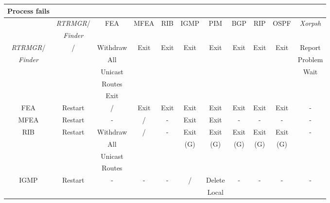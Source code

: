 \documentclass[11pt]{article}
\makeatletter
\newcommand{\finder} {{\em Finder}\@\xspace}
\newcommand{\xorpsh} {{\em Xorpsh}\@\xspace}
\newcommand{\rtrmgr} {{\em RTRMGR}\@\xspace}
\makeatother
\begin{document}
\begin{table}[ht]
\begin{center}
\begin{tabular}{|c|c|c|c|c|c|c|c|c|c|c|}
\hline
Process fails   &                 &          &      &      &      &         &      &      &      &         \\\hline
                & \rtrmgr/        & FEA      & MFEA & RIB  & IGMP & PIM     & BGP  & RIP  & OSPF & \xorpsh \\
                & \finder         &          &      &      &      &         &      &      &      &         \\\hline
\rtrmgr/        & /               & Withdraw & Exit & Exit & Exit & Exit    & Exit & Exit & Exit & Report  \\
\finder         &                 & All      &      &      &      &         &      &      &      & Problem \\
                &                 & Unicast  &      &      &      &         &      &      &      & Wait    \\
                &                 & Routes   &      &      &      &         &      &      &      &         \\
                &                 & Exit     &      &      &      &         &      &      &      &         \\\hline
FEA             &  Restart        & /        & Exit & Exit & Exit & Exit    & Exit & Exit & Exit & -       \\\hline
MFEA            &  Restart        & -        & /    & -    & Exit & Exit    & -    & -    & -    & -       \\\hline
RIB             &  Restart        & Withdraw & /    & -    & Exit & Exit    & Exit & Exit & Exit & -       \\
                &                 & All      &      &      & (G)  & (G)     & (G)  & (G)  & (G)  &         \\
                &                 & Unicast  &      &      &      &         &      &      &      &         \\
                &                 & Routes   &      &      &      &         &      &      &      &         \\\hline
IGMP            &  Restart        & -        & -    & -    & /    & Delete  & -    & -    & -    & -       \\
                &                 &          &      &      &      & Local   &      &      &      &         \\

\end{tabular}
\end{center}
\end{table}
\end{document}
